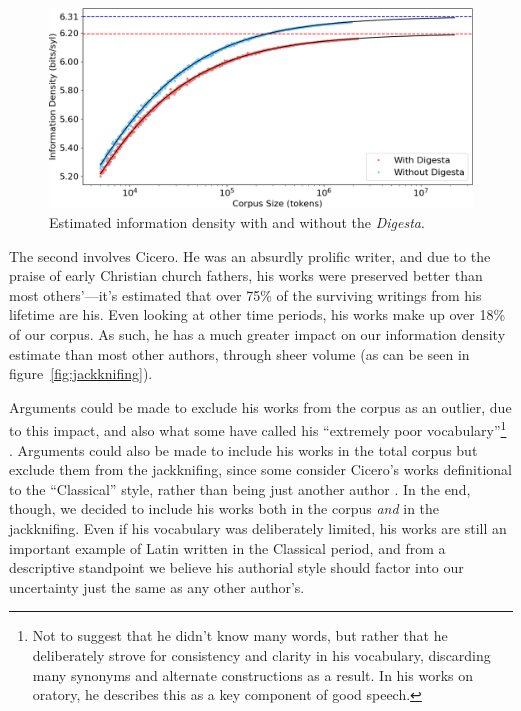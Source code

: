 \documentclass[12pt,twoside]{article}
\begin{document}
\begin{figure}[h]
\centering
\noindent\includegraphics[width=\linewidth]{digesta}
\caption{Estimated information density with and without the \emph{Digesta}.}
\label{fig:digesta}
\end{figure}

The second involves Cicero. He was an absurdly prolific writer, and due to the praise of early Christian church fathers, his works were preserved better than most others'---it's estimated that over 75\% of the surviving writings from his lifetime are his. Even looking at other time periods, his works make up over 18\% of our corpus. As such, he has a much greater impact on our information density estimate than most other authors, through sheer volume (as can be seen in figure~\ref{fig:jackknifing}).

Arguments could be made to exclude his works from the corpus as an outlier, due to this impact, and also what some have called his ``extremely poor vocabulary''\footnote{Not to suggest that he didn't know many words, but rather that he deliberately strove for consistency and clarity in his vocabulary, discarding many synonyms and alternate constructions as a result. In his works on oratory, he describes this as a key component of good speech.} \citep[136]{albrecht}. Arguments could also be made to include his works in the total corpus but exclude them from the jackknifing, since some consider Cicero's works definitional to the ``Classical'' style, rather than being just another author \citep[136]{albrecht}. In the end, though, we decided to include his works both in the corpus \emph{and} in the jackknifing. Even if his vocabulary was deliberately limited, his works are still an important example of Latin written in the Classical period, and from a descriptive standpoint we believe his authorial style should factor into our uncertainty just the same as any other author's.
\end{document}
